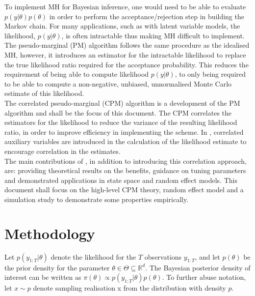 \documentclass{article}
\begin{document}
To implement MH for Bayesian inference, one would need to be able to evaluate $p(y|\theta) p(\theta)$ in order to perform the acceptance/rejection step in building the Markov chain. For many applications, such as with latent variable models, the likelihood, $ p(y | \theta)$, is often intractable thus making MH difficult to implement. \\

The pseudo-marginal (PM) algorithm follows the same procedure as the idealised MH, however, it introduces an estimator for the intractable likelihood to replace the true likelihood ratio required for the acceptance probability. This reduces the requirement of being able to compute likelihood $p(y|\theta)$, to only being required to be able to compute a non-negative, unbiased, unnormalised Monte Carlo estimate of this likelihood. \\

The correlated pseudo-marginal (CPM) algorithm is a development of the PM algorithm and shall be the focus of this document. The CPM correlates the estimators for the likelihood to reduce the variance of the resulting likelihood ratio, in order to improve efficiency in implementing the scheme. In \cite{cpmmDeligiannidis2015}, correlated auxiliary variables are introduced in the calculation of the likelihood estimate to encourage correlation in the estimates.\\

The main contributions of \cite{cpmmDeligiannidis2015}, in addition to introducing this correlation approach, are: providing theoretical results on the benefits, guidance on tuning parameters and demonstrated applications in state space and random effect models. This document shall focus on the high-level CPM theory, random effect model and a simulation study to demonstrate some properties empirically.

\section{Methodology}
Let $p(y_{1:T}|\theta)$ denote the likelihood for the $T$ observations $y_{1:T}$, and let $p(\theta)$ be the prior density for the parameter $\theta \in \Theta \subseteq \mathbb{R}^{d}$. The Bayesian posterior density of interest can be written as $\pi (\theta) \propto p(y_{1:T}|\theta) p(\theta)$. To further abuse notation, let $x \sim p$ denote sampling realisation x from the distribution with density $p$.\\
\end{document}
